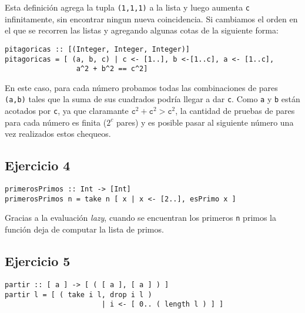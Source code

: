 Esta definición agrega la tupla \texttt{(1,1,1)} a la lista y luego aumenta \texttt{c} infinitamente, sin encontrar ningun nueva coincidencia. Si cambiamos el orden en el que se recorren las listas y agregando algunas cotas de la siguiente forma:
\begin{centrado}
\begin{verbatim}
pitagoricas :: [(Integer, Integer, Integer)]
pitagoricas = [ (a, b, c) | c <- [1..], b <-[1..c], a <- [1..c],
                 a^2 + b^2 == c^2]
\end{verbatim}
\end{centrado}
En este caso, para cada número probamos todas las combinaciones de pares \texttt{(a,b)} tales que la suma de sus cuadrados podría llegar a dar \texttt{c}. Como \texttt{a} y \texttt{b} están acotados por \texttt{c}, ya que claramante $\texttt{c}^2 + \texttt{c}^2 > \texttt{c}^2$, la cantidad de pruebas de pares para cada número es finita ($2^c$ pares) y es posible pasar al siguiente número una vez realizados estos chequeos.


\subsection{Ejercicio 4}
\begin{centrado}
\begin{verbatim}
primerosPrimos :: Int -> [Int]
primerosPrimos n = take n [ x | x <- [2..], esPrimo x ]
\end{verbatim}
\end{centrado}

Gracias a la evaluación \textit{lazy}, cuando se encuentran los primeros \texttt{n} primos la función deja de computar la lista de primos.

\subsection{Ejercicio 5}
\begin{centrado}
	\begin{verbatim}
partir :: [ a ] -> [ ( [ a ], [ a ] ) ]
partir l = [ ( take i l, drop i l ) 
                       | i <- [ 0.. ( length l ) ] ]
	\end{verbatim}
\end{centrado}



